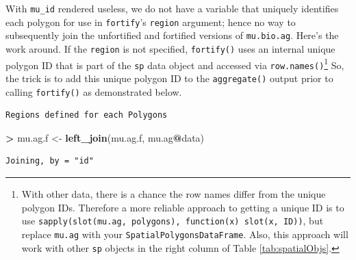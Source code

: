 \documentclass[]{krantz}
\makeatletter
\newenvironment{Shaded}{\begin{snugshade}}{\end{snugshade}}
\newcommand{\KeywordTok}[1]{\textcolor[rgb]{0.27,0.27,0.27}{\textbf{#1}}}
\newcommand{\StringTok}[1]{\textcolor[rgb]{0.5,0.5,0.5}{#1}}
\newcommand{\OperatorTok}[1]{\textcolor[rgb]{0.43,0.43,0.43}{\textbf{#1}}}
\newcommand{\ErrorTok}[1]{\textcolor[rgb]{0.14,0.14,0.14}{\textbf{#1}}}
\newcommand{\NormalTok}[1]{#1}
\newenvironment{kframe}{%
\medskip{}
\setlength{\fboxsep}{.8em}
 \def\at@end@of@kframe{}%
 \ifinner\ifhmode%
  \def\at@end@of@kframe{\end{minipage}}%
  \begin{minipage}{\columnwidth}%
 \fi\fi%
 \def\FrameCommand##1{\hskip\@totalleftmargin \hskip-\fboxsep
 \colorbox{shadecolor}{##1}\hskip-\fboxsep
     \hskip-\linewidth \hskip-\@totalleftmargin \hskip\columnwidth}%
 \MakeFramed {\advance\hsize-\width
   \@totalleftmargin\z@ \linewidth\hsize
   \@setminipage}}%
 {\par\unskip\endMakeFramed%
 \at@end@of@kframe}
\renewenvironment{Shaded}{\begin{kframe}}{\end{kframe}}
\theoremstyle{definition}
\theoremstyle{definition}
\theoremstyle{definition}
\theoremstyle{remark}
\makeatother
\begin{document}
With \texttt{mu\_id} rendered useless, we do not have a variable that
uniquely identifies each polygon for use in \texttt{fortify}'s
\texttt{region} argument; hence no way to subsequently join the
unfortified and fortified versions of \texttt{mu.bio.ag}. Here's the
work around. If the \texttt{region} is not specified, \texttt{fortify()}
uses an internal unique polygon ID that is part of the \texttt{sp} data
object and accessed via \texttt{row.names()}\footnote{With other data,
  there is a chance the row names differ from the unique polygon IDs.
  Therefore a more reliable approach to getting a unique ID is to use
  \texttt{sapply(slot(mu.ag,\ \textquotesingle{}polygons\textquotesingle{}),\ function(x)\ slot(x,\ \textquotesingle{}ID\textquotesingle{}))},
  but replace \texttt{mu.ag} with your
  \texttt{SpatialPolygonsDataFrame}. Also, this approach will work with
  other \texttt{sp} objects in the right column of Table
  \ref{tab:spatialObjs}.} So, the trick is to add this unique polygon ID
to the \texttt{aggregate()} output prior to calling \texttt{fortify()}
as demonstrated below.

\begin{Shaded}
\end{Shaded}

\begin{verbatim}
Regions defined for each Polygons
\end{verbatim}

\begin{Shaded}
\begin{Highlighting}[]
\OperatorTok{>}\StringTok{ }\NormalTok{mu.ag.f <-}\StringTok{ }\KeywordTok{left_join}\NormalTok{(mu.ag.f, mu.ag}\OperatorTok{@}\NormalTok{data)}
\end{Highlighting}
\end{Shaded}

\begin{verbatim}
Joining, by = "id"
\end{verbatim}
\end{document}
